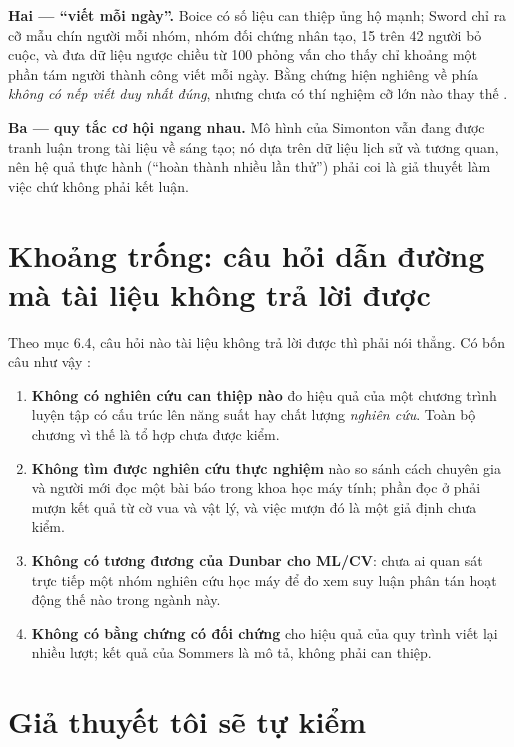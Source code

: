 \documentclass[hieu-suat.tex]{subfiles}
\begin{document}
\textbf{Hai --- ``viết mỗi ngày''.} Boice \cite{boice1983,boice1989} có số liệu can thiệp ủng hộ mạnh; Sword \cite{sword2016} chỉ ra cỡ mẫu chín người mỗi nhóm, nhóm đối chứng nhân tạo, 15 trên 42 người bỏ cuộc, và đưa dữ liệu ngược chiều từ 100 phỏng vấn cho thấy chỉ khoảng một phần tám người thành công viết mỗi ngày. Bằng chứng hiện nghiêng về phía \emph{không có nếp viết duy nhất đúng}, nhưng chưa có thí nghiệm cỡ lớn nào thay thế \nM{}.

\textbf{Ba --- quy tắc cơ hội ngang nhau.} Mô hình của Simonton \cite{simonton1997} vẫn đang được tranh luận trong tài liệu về sáng tạo; nó dựa trên dữ liệu lịch sử và tương quan, nên hệ quả thực hành (``hoàn thành nhiều lần thử'') phải coi là giả thuyết làm việc chứ không phải kết luận.

\section{Khoảng trống: câu hỏi dẫn đường mà tài liệu không trả lời được}

Theo  mục 6.4, câu hỏi nào tài liệu không trả lời được thì phải nói thẳng. Có bốn câu như vậy \nM{}:

\begin{enumerate}
\item \textbf{Không có nghiên cứu can thiệp nào} đo hiệu quả của một chương trình luyện tập có cấu trúc lên năng suất hay chất lượng \emph{nghiên cứu}. Toàn bộ chương  vì thế là tổ hợp chưa được kiểm.
\item \textbf{Không tìm được nghiên cứu thực nghiệm} nào so sánh cách chuyên gia và người mới đọc một bài báo trong khoa học máy tính; phần đọc ở  phải mượn kết quả từ cờ vua và vật lý, và việc mượn đó là một giả định chưa kiểm.
\item \textbf{Không có tương đương của Dunbar cho ML/CV}: chưa ai quan sát trực tiếp một nhóm nghiên cứu học máy để đo xem suy luận phân tán hoạt động thế nào trong ngành này.
\item \textbf{Không có bằng chứng có đối chứng} cho hiệu quả của quy trình viết lại nhiều lượt; kết quả của Sommers \cite{sommers1980} là mô tả, không phải can thiệp.
\end{enumerate}

\section{Giả thuyết tôi sẽ tự kiểm}
\end{document}
